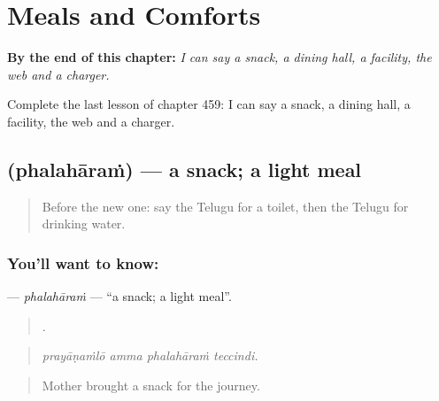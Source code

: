 
\chapter{Meals and Comforts}
\label{ch:te-meals-and-comforts}

\begin{chapteropening}
\textbf{By the end of this chapter:} \emph{I can say a snack, a dining hall, a facility, the web and a charger.}

Complete the last lesson of chapter 459: I can say a snack, a dining hall, a facility, the web and a charger.
\end{chapteropening}

\section[\texorpdfstring{\te{ఫలహారం} (phalahāraṁ)}{ఫలహారం (phalahāraṁ)}]{ (phalahāraṁ) — a snack; a light meal}

\label{lesson:TE-C459-phalaharam}



\begin{quote}
Before the new one: say the Telugu for a toilet, then the Telugu for drinking water.
\end{quote}

\subsection*{You'll want to know: }
\textbf{} — \emph{phalahāraṁ} — \textquotedblleft{}a snack; a light meal\textquotedblright{}.

\begin{quote}
   .
\end{quote}

\begin{quote}
\emph{prayāṇaṁlō amma phalahāraṁ teccindi.}
\end{quote}

\begin{quote}
Mother brought a snack for the journey.
\end{quote}


